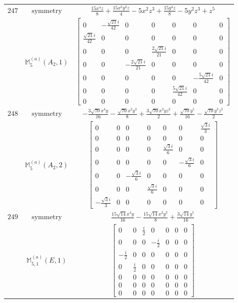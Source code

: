 \documentclass[fleqn,8pt,landscape]{jsarticle}
\begin{document}
\begin{longtable}{ccc}
$ 247 $ & $ \text{symmetry} $ & $ \frac{15 x^{4} z}{8} + \frac{15 x^{2} y^{2} z}{4} - 5 x^{2} z^{3} + \frac{15 y^{4} z}{8} - 5 y^{2} z^{3} + z^{5} $ \\
$  $ & $ \mathbb{M}_{5}^{(a)}(A_{2},1) $ & $ \begin{bmatrix} 0 & - \frac{\sqrt{21} i}{42} & 0 & 0 & 0 & 0 & 0 \\ \frac{\sqrt{21} i}{42} & 0 & 0 & 0 & 0 & 0 & 0 \\ 0 & 0 & 0 & \frac{2 \sqrt{21} i}{21} & 0 & 0 & 0 \\ 0 & 0 & - \frac{2 \sqrt{21} i}{21} & 0 & 0 & 0 & 0 \\ 0 & 0 & 0 & 0 & 0 & - \frac{5 \sqrt{21} i}{42} & 0 \\ 0 & 0 & 0 & 0 & \frac{5 \sqrt{21} i}{42} & 0 & 0 \\ 0 & 0 & 0 & 0 & 0 & 0 & 0 \end{bmatrix} $ \\ \hline
$ 248 $ & $ \text{symmetry} $ & $ - \frac{3 \sqrt{70} x^{4} y}{16} - \frac{\sqrt{70} x^{2} y^{3}}{8} + \frac{3 \sqrt{70} x^{2} y z^{2}}{2} + \frac{\sqrt{70} y^{5}}{16} - \frac{\sqrt{70} y^{3} z^{2}}{2} $ \\
$  $ & $ \mathbb{M}_{5}^{(a)}(A_{2},2) $ & $ \begin{bmatrix} 0 & 0 & 0 & 0 & 0 & 0 & \frac{\sqrt{3} i}{3} \\ 0 & 0 & 0 & 0 & 0 & 0 & 0 \\ 0 & 0 & 0 & 0 & \frac{\sqrt{3} i}{6} & 0 & 0 \\ 0 & 0 & 0 & 0 & 0 & - \frac{\sqrt{3} i}{6} & 0 \\ 0 & 0 & - \frac{\sqrt{3} i}{6} & 0 & 0 & 0 & 0 \\ 0 & 0 & 0 & \frac{\sqrt{3} i}{6} & 0 & 0 & 0 \\ - \frac{\sqrt{3} i}{3} & 0 & 0 & 0 & 0 & 0 & 0 \end{bmatrix} $ \\ \hline
$ 249 $ & $ \text{symmetry} $ & $ \frac{15 \sqrt{14} x^{4} y}{16} - \frac{15 \sqrt{14} x^{2} y^{3}}{8} + \frac{3 \sqrt{14} y^{5}}{16} $ \\
$  $ & $ \mathbb{M}_{5,1}^{(a)}(E,1) $ & $ \begin{bmatrix} 0 & 0 & \frac{i}{2} & 0 & 0 & 0 & 0 \\ 0 & 0 & 0 & - \frac{i}{2} & 0 & 0 & 0 \\ - \frac{i}{2} & 0 & 0 & 0 & 0 & 0 & 0 \\ 0 & \frac{i}{2} & 0 & 0 & 0 & 0 & 0 \\ 0 & 0 & 0 & 0 & 0 & 0 & 0 \\ 0 & 0 & 0 & 0 & 0 & 0 & 0 \\ 0 & 0 & 0 & 0 & 0 & 0 & 0 \end{bmatrix} $ \\ \hline

\end{longtable}
\end{document}
